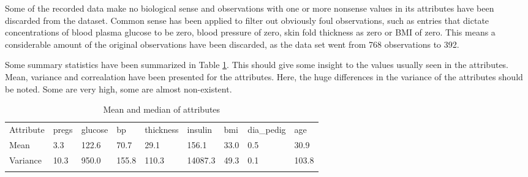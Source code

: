 Some of the recorded data make no biological sense and observations with one or
more nonsense values in its attributes have been discarded from the dataset.
Common sense has been applied to filter out obviously foul observations, such
as entries that dictate concentrations of blood plasma glucose to be zero, blood
pressure of zero, skin fold thickness as zero or BMI of zero. This means a
considerable amount of the original observations have been discarded, as the
data set went from 768 observations to 392.
\bigskip

Some summary statistics have been summarized in Table \ref{tab:stats}. This should
give some insight to the values usually seen in the attributes. Mean, variance
and correalation have been presented for the attributes. Here, the huge differences
in the variance of the attributes should be noted. Some are very high, some are
almost non-existent.

\begin{table}[]
\centering
\caption{Mean and median of attributes}\label{tab:stats}
\begin{tabular}{lllllllll}
\cline{1-1}
\multicolumn{1}{|l|}{Attribute} & pregs & glucose & bp   & thickness & insulin & bmi  & dia\_pedig & age  \\ \cline{1-1}
\multicolumn{1}{|l|}{Mean}      & 3.3   & 122.6   & 70.7 & 29.1      & 156.1   & 33.0 & 0.5        & 30.9 \\ \cline{1-1}
\multicolumn{1}{|l|}{Variance}  & 10.3     & 950.0     & 155.8   & 110.3        & 14087.3    & 49.3 & 0.1       & 103.8 \\ \cline{1-1}
                                                       &       &         &      &           &         &      &            &      \\ \hline
\end{tabular}
\end{table}

